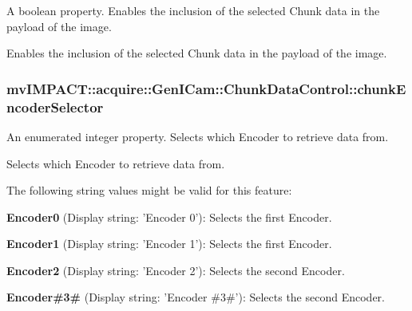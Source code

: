 A boolean property. Enables the inclusion of the selected Chunk data in the payload of the image. 

Enables the inclusion of the selected Chunk data in the payload of the image. \hypertarget{classmv_i_m_p_a_c_t_1_1acquire_1_1_gen_i_cam_1_1_chunk_data_control_a147570f20aaa1f8afa4b6da7d18a7b35}{
\subsubsection[{chunk\+Encoder\+Selector}]{ mv\+I\+M\+P\+A\+C\+T\+::acquire\+::\+Gen\+I\+Cam\+::\+Chunk\+Data\+Control\+::chunk\+Encoder\+Selector}}\label{classmv_i_m_p_a_c_t_1_1acquire_1_1_gen_i_cam_1_1_chunk_data_control_a147570f20aaa1f8afa4b6da7d18a7b35}


An enumerated integer property. Selects which Encoder to retrieve data from. 

Selects which Encoder to retrieve data from.

The following string values might be valid for this feature\+:
\begin{DoxyItemize}
\item {\bfseries Encoder0} (Display string\+: 'Encoder 0')\+: Selects the first Encoder.
\item {\bfseries Encoder1} (Display string\+: 'Encoder 1')\+: Selects the first Encoder.
\item {\bfseries Encoder2} (Display string\+: 'Encoder 2')\+: Selects the second Encoder.
\item {\bfseries Encoder\#3\#} (Display string\+: 'Encoder \#3\#')\+: Selects the second Encoder.
\end{DoxyItemize}

